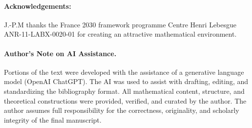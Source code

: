 \documentclass[11pt]{amsart}
\theoremstyle{plain}
\theoremstyle{definition}
\theoremstyle{remark}
\theoremstyle{remark}
\begin{document}
\paragraph{\bf Acknowledgements:} J.-P.M thanks the France 2030 framework programme Centre Henri Lebesgue ANR-11-LABX-0020-01 
for creating an attractive mathematical environment.

\vskip 12pt

\paragraph{\bf Author's Note on AI Assistance.}
Portions of the text were developed with the assistance of a generative language model (OpenAI ChatGPT). The AI was used to assist with drafting, editing, and standardizing the bibliography format. All mathematical content, structure, and theoretical constructions were provided, verified, and curated by the author. The author assumes full responsibility for the correctness, originality, and scholarly integrity of the final manuscript.
\end{document}
